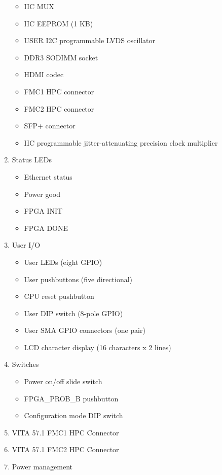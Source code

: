 \begin{enumerate}
  \begin{itemize}
    \item IIC MUX
    \item IIC EEPROM (1 KB)
    \item USER I2C programmable LVDS oscillator
    \item DDR3 SODIMM socket
    \item HDMI codec
    \item FMC1 HPC connector
    \item FMC2 HPC connector
    \item SFP+ connector
    \item IIC programmable jitter-attenuating precision clock multiplier
  \end{itemize}

  \item Status LEDs

  \begin{itemize}
    \item Ethernet status
    \item Power good
    \item FPGA INIT
    \item FPGA DONE
  \end{itemize}

  \item User I/O
  \begin{itemize}
    \item User LEDs (eight GPIO)
    \item User pushbuttons (five directional)
    \item CPU reset pushbutton
    \item User DIP switch (8-pole GPIO)
    \item User SMA GPIO connectors (one pair)
    \item LCD character display (16 characters x 2 lines)
  \end{itemize}

  \item Switches

  \begin{itemize}
    \item Power on/off slide switch
    \item FPGA\_PROB\_B pushbutton
    \item Configuration mode DIP switch
  \end{itemize}

  \item VITA 57.1 FMC1 HPC Connector
  \item VITA 57.1 FMC2 HPC Connector
  \item Power management


\end{enumerate}
